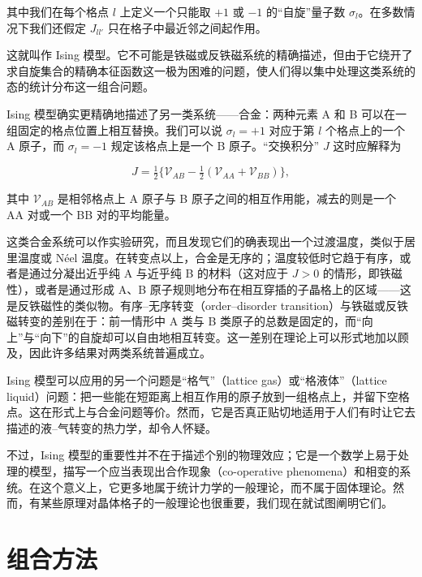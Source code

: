 
其中我们在每个格点 $l$ 上定义一个只能取 $+1$ 或 $-1$ 的“自旋”量子数 $\sigma_l$。在多数情况下我们还假定 $J_{ll'}$ 只在格子中最近邻之间起作用。

这就叫作 Ising 模型。它不可能是铁磁或反铁磁系统的精确描述，但由于它绕开了求自旋集合的精确本征函数这一极为困难的问题，使人们得以集中处理这类系统的态的统计分布这一组合问题。

Ising 模型确实更精确地描述了另一类系统——合金：两种元素 A 和 B 可以在一组固定的格点位置上相互替换。我们可以说 $\sigma_l = +1$ 对应于第 $l$ 个格点上的一个 A 原子，而 $\sigma_l = -1$ 规定该格点上是一个 B 原子。“交换积分” $J$ 这时应解释为

\begin{equation*}
J = \tfrac{1}{2}\bigl\{ \mathcal{V}_{AB} - \tfrac{1}{2}(\mathcal{V}_{AA} + \mathcal{V}_{BB}) \bigr\},
\tag{10.70}
\end{equation*}

其中 $\mathcal{V}_{AB}$ 是相邻格点上 A 原子与 B 原子之间的相互作用能，减去的则是一个 AA 对或一个 BB 对的平均能量。

这类合金系统可以作实验研究，而且发现它们的确表现出一个过渡温度，类似于居里温度或 Néel 温度。在转变点以上，合金是无序的；温度较低时它趋于有序，或者是通过分凝出近乎纯 A 与近乎纯 B 的材料（这对应于 $J > 0$ 的情形，即铁磁性），或者是通过形成 A、B 原子规则地分布在相互穿插的子晶格上的区域——这是反铁磁性的类似物。有序–无序转变（order–disorder transition）与铁磁或反铁磁转变的差别在于：前一情形中 A 类与 B 类原子的总数是固定的，而“向上”与“向下”的自旋却可以自由地相互转变。这一差别在理论上可以形式地加以顾及，因此许多结果对两类系统普遍成立。

Ising 模型可以应用的另一个问题是“格气”（lattice gas）或“格液体”（lattice liquid）问题：把一些能在短距离上相互作用的原子放到一组格点上，并留下空格点。这在形式上与合金问题等价。然而，它是否真正贴切地适用于人们有时让它去描述的液–气转变的热力学，却令人怀疑。

不过，Ising 模型的重要性并不在于描述个别的物理效应；它是一个数学上易于处理的模型，描写一个应当表现出合作现象（co-operative phenomena）和相变的系统。在这个意义上，它更多地属于统计力学的一般理论，而不属于固体理论。然而，有某些原理对晶体格子的一般理论也很重要，我们现在就试图阐明它们。

\section{组合方法}


